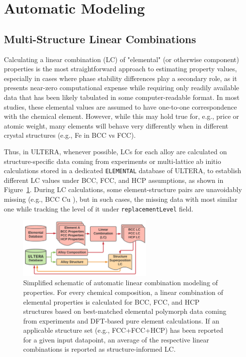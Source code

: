 \section{Automatic Modeling} \label{ultera:sec:automodel}

\subsection{Multi-Structure Linear Combinations} \label{ultera:ssec:autolc}



Calculating a linear combination (LC) of "elemental" (or otherwise component) properties is the most straightforward approach to estimating property values, especially in cases where phase stability differences play a secondary role, as it presents near-zero computational expense while requiring only readily available data that has been likely tabulated in some computer-readable format. In most studies, these elemental values are assumed to have one-to-one correspondence with the chemical element. However, while this may hold true for, e.g., price or atomic weight, many elements will behave very differently when in different crystal structures (e.g., Fe in BCC vs FCC).

Thus, in ULTERA, whenever possible, LCs for each alloy are calculated on structure-specific data coming from experiments or multi-lattice ab initio calculations \cite{Chong2021CorrelationAlloys} stored in a dedicated \texttt{ELEMENTAL} database of ULTERA, to establish different LC values under BCC, FCC, and HCP assumptions, as shown in Figure~\ref{ultera:fig:autolc}. During LC calculations, some element-structure pairs are unavoidably missing (e.g., BCC Cu \cite{Chong2021CorrelationAlloys}), but in such cases, the missing data with most similar one while tracking the level of it under \texttt{replacementLevel} field. 

\begin{figure}[H]
    \centering
    \includegraphics[width=0.6\textwidth]{ultera/ULTERA_ElementalDatabase_LC_V1.png}
    \caption{Simplified schematic of automatic linear combination modeling of properties. For every chemical composition, a linear combination of elemental properties is calculated for BCC, FCC, and HCP structures based on best-matched elemental polymorph data coming from experiments and DFT-based pure element calculations. If an applicable structure set (e.g., FCC+FCC+HCP) has been reported for a given input datapoint, an average of the respective linear combinations is reported as structure-informed LC.}
    \label{ultera:fig:autolc}
\end{figure}

